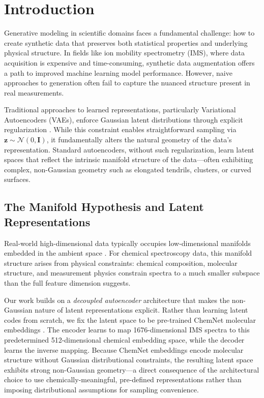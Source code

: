 \documentclass[sigconf]{acmart}
\begin{document}
\maketitle

\section{Introduction}

Generative modeling in scientific domains faces a fundamental challenge: how to create synthetic data that preserves both statistical properties and underlying physical structure. In fields like ion mobility spectrometry (IMS), where data acquisition is expensive and time-consuming, synthetic data augmentation offers a path to improved machine learning model performance. However, naive approaches to generation often fail to capture the nuanced structure present in real measurements.

Traditional approaches to learned representations, particularly Variational Autoencoders (VAEs), enforce Gaussian latent distributions through explicit regularization \cite{kingma2014auto}. While this constraint enables straightforward sampling via $\mathbf{z} \sim \mathcal{N}(0, \mathbf{I})$, it fundamentally alters the natural geometry of the data's representation. Standard autoencoders, without such regularization, learn latent spaces that reflect the intrinsic manifold structure of the data—often exhibiting complex, non-Gaussian geometry such as elongated tendrils, clusters, or curved surfaces.

\subsection{The Manifold Hypothesis and Latent Representations}

Real-world high-dimensional data typically occupies low-dimensional manifolds embedded in the ambient space \cite{bengio2013representation}. For chemical spectroscopy data, this manifold structure arises from physical constraints: chemical composition, molecular structure, and measurement physics constrain spectra to a much smaller subspace than the full feature dimension suggests.

Our work builds on a \textit{decoupled autoencoder} architecture \cite{dunham2024oracle} that makes the non-Gaussian nature of latent representations explicit. Rather than learning latent codes from scratch, we fix the latent space to be pre-trained ChemNet molecular embeddings \cite{preuer2019frechet}. The encoder learns to map 1676-dimensional IMS spectra to this predetermined 512-dimensional chemical embedding space, while the decoder learns the inverse mapping. Because ChemNet embeddings encode molecular structure without Gaussian distributional constraints, the resulting latent space exhibits strong non-Gaussian geometry—a direct consequence of the architectural choice to use chemically-meaningful, pre-defined representations rather than imposing distributional assumptions for sampling convenience.
\end{document}
